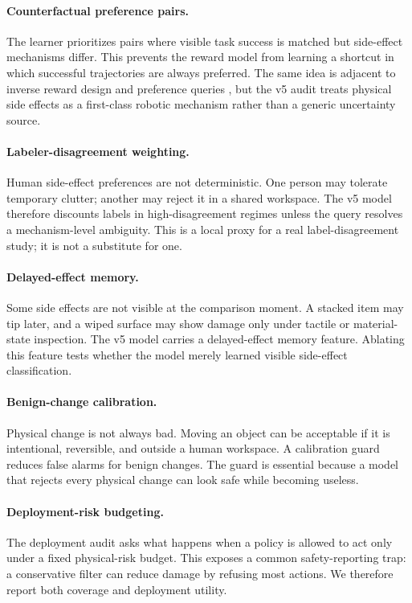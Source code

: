 \documentclass{article}
\begin{document}
\paragraph{Counterfactual preference pairs.}
The learner prioritizes pairs where visible task success is matched but side-effect mechanisms differ. This prevents the reward model from learning a shortcut in which successful trajectories are always preferred. The same idea is adjacent to inverse reward design and preference queries \citep{hadfieldmenell2017inverse,sadigh2017active}, but the v5 audit treats physical side effects as a first-class robotic mechanism rather than a generic uncertainty source.

\paragraph{Labeler-disagreement weighting.}
Human side-effect preferences are not deterministic. One person may tolerate temporary clutter; another may reject it in a shared workspace. The v5 model therefore discounts labels in high-disagreement regimes unless the query resolves a mechanism-level ambiguity. This is a local proxy for a real label-disagreement study; it is not a substitute for one.

\paragraph{Delayed-effect memory.}
Some side effects are not visible at the comparison moment. A stacked item may tip later, and a wiped surface may show damage only under tactile or material-state inspection. The v5 model carries a delayed-effect memory feature. Ablating this feature tests whether the model merely learned visible side-effect classification.

\paragraph{Benign-change calibration.}
Physical change is not always bad. Moving an object can be acceptable if it is intentional, reversible, and outside a human workspace. A calibration guard reduces false alarms for benign changes. The guard is essential because a model that rejects every physical change can look safe while becoming useless.

\paragraph{Deployment-risk budgeting.}
The deployment audit asks what happens when a policy is allowed to act only under a fixed physical-risk budget. This exposes a common safety-reporting trap: a conservative filter can reduce damage by refusing most actions. We therefore report both coverage and deployment utility.
\end{document}

